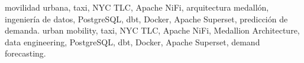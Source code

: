          {movilidad urbana, taxi, NYC TLC, Apache NiFi, arquitectura medallón, ingeniería de datos, PostgreSQL, dbt, Docker, Apache Superset, predicción de demanda.}            %
         {urban mobility, taxi, NYC TLC, Apache NiFi, Medallion Architecture, data engineering, PostgreSQL, dbt, Docker, Apache Superset, demand forecasting.}        %